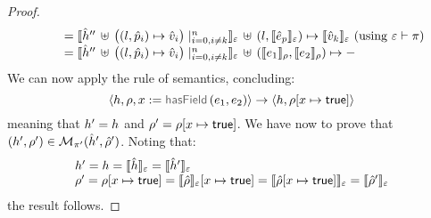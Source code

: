 \begin{proof}
$$\begin{array}{l}
     \qquad = \semexpr{\sheap'' \, \uplus \, \big((l, \sexprp_i) \mapsto \sexprv_i\big)\mid_{i = 0, i\neq k}^n}{\senv} \dunion (l, \semexpr{\sexpr_p}{\senv}) \mapsto \semexpr{\sexprv_k}{\senv}
      			\text{ (using $\senv \vdash \pc$)} \\ 
     \qquad = \semexpr{\sheap'' \, \uplus \, \big((l, \sexprp_i) \mapsto \sexprv_i\big)\mid_{i = 0, i\neq k}^n}{\senv} \dunion (\symbeval{\jsilexpr_1}{\store}, \symbeval{\jsilexpr_2}{\store}) \mapsto - \\
\end{array}
$$
We can now apply the  rule of \jsil semantics, concluding: 
$$
   \semtrans{\heap, \store, \jvar := \hasfield(\jsilexpr_1, \jsilexpr_2)}{\heap,  \store[\jvar \mapsto \jtrue]}
$$
meaning that $\heap' = \heap$ and $\store' = \store[\jvar \mapsto \jtrue]$. 
%
We have now to prove that $(\heap', \store') \in \smodels{\sheap', \sstore'}{\pc'}$.
Noting that:
$$
\begin{array}{l}
\heap' = \heap = \semexpr{\sheap}{\senv} = \semexpr{\sheap'}{\senv} \\
 \store' = \store[\jvar \mapsto \jtrue] = \symbeval{\sstore}{\senv}[\jvar \mapsto \jtrue]  = \symbeval{\sstore[\jvar \mapsto \jtrue]}{\senv} = \symbeval{\sstore'}{\senv} 
\end{array}
$$
the result follows. 
\vspace{6pt}



\end{proof}
